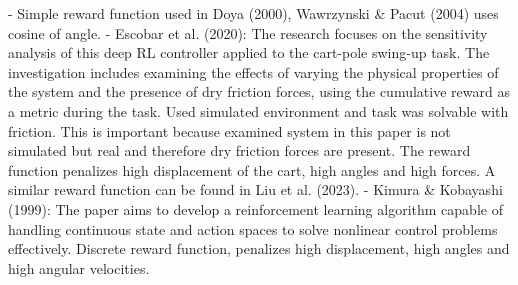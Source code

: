 - Simple reward function used in Doya (2000), Wawrzynski & Pacut (2004) uses cosine of angle. 
- Escobar et al. (2020): The research focuses on the sensitivity analysis of this deep RL controller applied to the cart-pole swing-up task. The investigation includes examining the effects of varying the physical properties of the system and the presence of dry friction forces, using the cumulative reward as a metric during the task. Used simulated environment and task was solvable with friction. This is important because examined system in this paper is not simulated but real and therefore dry friction forces are present. The reward function penalizes high displacement  of the cart, high angles and high forces. A similar reward function can be found in Liu et al. (2023).
- Kimura & Kobayashi (1999): The paper aims to develop a reinforcement learning algorithm capable of handling continuous state and action spaces to solve nonlinear control problems effectively. Discrete reward function, penalizes high displacement, high angles and high angular velocities.